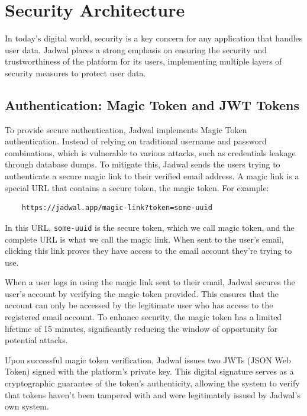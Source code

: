 \section{Security Architecture}

In today's digital world, security is a key concern for any application that handles user data. Jadwal places a strong emphasis on ensuring the security and trustworthiness of the platform for its users, implementing multiple layers of security measures to protect user data.

\subsection{Authentication: Magic Token and JWT Tokens}

To provide secure authentication, Jadwal implements Magic Token authentication. Instead of relying on traditional username and password combinations, which is vulnerable to various attacks, such as credentials leakage through database dumps. To mitigate this, Jadwal sends the users trying to authenticate a secure magic link to their verified email address. A magic link is a special URL that contains a secure token, the magic token. For example:

\begin{verbatim}
    https://jadwal.app/magic-link?token=some-uuid
\end{verbatim}

In this URL, \texttt{some-uuid} is the secure token, which we call magic token, and the complete URL is what we call the magic link. When sent to the user's email, clicking this link proves they have access to the email account they're trying to use.

When a user logs in using the magic link sent to their email, Jadwal secures the user's account by verifying the magic token provided. This ensures that the account can only be accessed by the legitimate user who has access to the registered email account. To enhance security, the magic token has a limited lifetime of 15 minutes, significantly reducing the window of opportunity for potential attacks.

Upon successful magic token verification, Jadwal issues two JWTs (JSON Web Token) signed with the platform's private key. This digital signature serves as a cryptographic guarantee of the token's authenticity, allowing the system to verify that tokens haven't been tampered with and were legitimately issued by Jadwal's own system.

